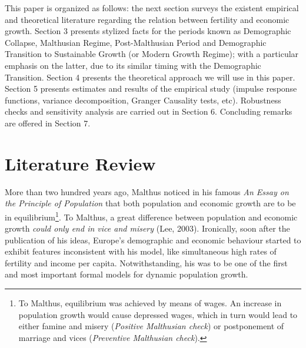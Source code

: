 \documentclass[12pt]{article}%
\begin{document}
This paper is organized as follows: the next section surveys the existent empirical and theoretical literature regarding the relation between fertility and economic growth. Section 3 presents stylized facts for the periods known as Demographic Collapse, Malthusian Regime, Post-Malthusian Period and Demographic Transition to Sustainable Growth (or Modern Growth Regime); with a particular emphasis on the latter, due to its similar timing with the Demographic Transition. Section 4 presents the theoretical approach we will use in this paper. Section 5 presents estimates and results of the empirical study (impulse response functions, variance decomposition, Granger Causality tests, etc). Robustness checks and sensitivity analysis are carried out in Section 6. Concluding remarks are offered in Section 7.
\section{Literature Review}
More than two hundred years ago, Malthus noticed in his famous \emph{An Essay on the Principle of Population} that both population and economic growth are to be in equilibrium\footnote{To Malthus, equilibrium was achieved by means of wages. An increase in population growth would cause depressed wages, which in turn would lead to either famine and misery (\emph{Positive Malthusian check}) or postponement of marriage and vices (\emph{Preventive Malthusian check}).}. To Malthus, a great difference between population and economic growth \emph{could only end in vice and misery} (Lee, 2003). Ironically, soon after the publication of his ideas, Europe's demographic and economic behaviour started to exhibit features inconsistent with his model, like simultaneous high rates of fertility and income per capita. Notwithstanding, his was to be one of the first and most important formal models for dynamic population growth.
\end{document}
